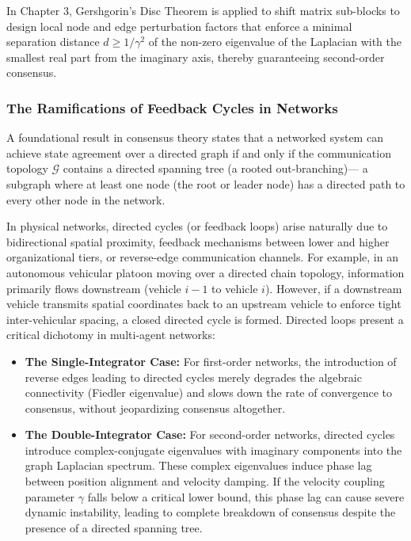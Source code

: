 In Chapter 3, Gershgorin's Disc Theorem is applied to shift matrix sub-blocks to design local node and edge perturbation factors that enforce a minimal separation distance $d \ge 1/\gamma^2$  of the non-zero eigenvalue of the Laplacian with the smallest real part from the imaginary axis, thereby guaranteeing second-order consensus.

\subsubsection{The Ramifications of Feedback Cycles in Networks}
A foundational result in consensus theory states that a networked system can achieve state agreement over a directed graph if and only if the communication topology $\mathcal{G}$ contains a directed spanning tree (a rooted out-branching)— a subgraph where at least one node (the root or leader node) has a directed path to every other node in the network. 

In physical networks, directed cycles (or feedback loops) arise naturally due to bidirectional spatial proximity, feedback mechanisms between lower and higher organizational tiers, or reverse-edge communication channels. For example, in an autonomous vehicular platoon moving over a directed chain topology, information primarily flows downstream (vehicle $i-1$ to vehicle $i$). However, if a downstream vehicle transmits spatial coordinates back to an upstream vehicle to enforce tight inter-vehicular spacing, a closed directed cycle is formed. Directed loops present a critical dichotomy in multi-agent networks:
\begin{itemize}
    \item \textbf{The Single-Integrator Case:} For first-order networks, the introduction of reverse edges leading to directed cycles merely degrades the algebraic connectivity (Fiedler eigenvalue) and slows down the rate of convergence to consensus, without jeopardizing consensus altogether.
    \item \textbf{The Double-Integrator Case:} For second-order networks, directed cycles introduce complex-conjugate eigenvalues with imaginary components into the graph Laplacian spectrum. These complex eigenvalues induce phase lag between position alignment and velocity damping. If the velocity coupling parameter $\gamma$ falls below a critical lower bound, this phase lag can cause severe dynamic instability, leading to complete breakdown of consensus despite the presence of a directed spanning tree.
\end{itemize}

